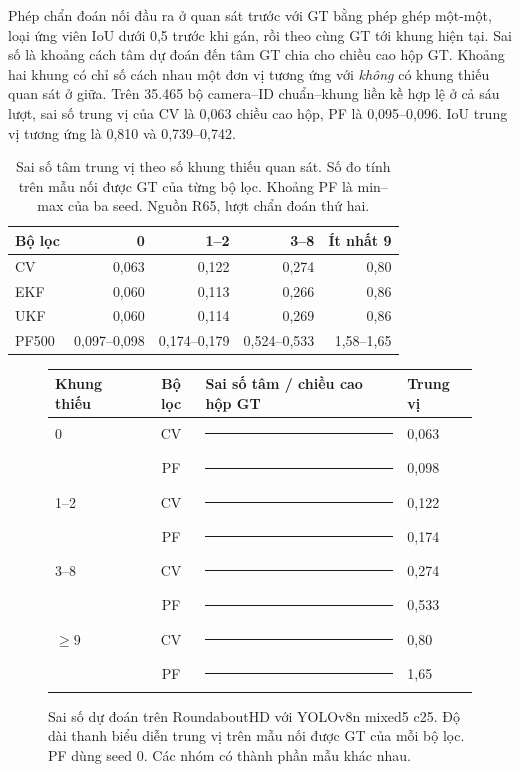 Phép chẩn đoán nối đầu ra ở quan sát trước với GT bằng phép ghép một-một, loại ứng viên IoU dưới 0,5 trước khi gán, rồi theo cùng GT tới khung hiện tại. Sai số là khoảng cách tâm dự đoán đến tâm GT chia cho chiều cao hộp GT. Khoảng hai khung có chỉ số cách nhau một đơn vị tương ứng với \emph{không} có khung thiếu quan sát ở giữa. Trên 35.465 bộ camera--ID chuẩn--khung liền kề hợp lệ ở cả sáu lượt, sai số trung vị của CV là 0,063 chiều cao hộp, PF là 0,095--0,096. IoU trung vị tương ứng là 0,810 và 0,739--0,742.

\begin{table}[htbp]\centering\small
\caption{Sai số tâm trung vị theo số khung thiếu quan sát. Số đo tính trên mẫu nối được GT của từng bộ lọc. Khoảng PF là min--max của ba seed. Nguồn R65, lượt chẩn đoán thứ hai.}\label{tab:gap}
\begin{tabular}{lrrrr}\hline
Bộ lọc & 0 & 1--2 & 3--8 & Ít nhất 9\\\hline
CV & 0,063 & 0,122 & 0,274 & 0,80\\
EKF & 0,060 & 0,113 & 0,266 & 0,86\\
UKF & 0,060 & 0,114 & 0,269 & 0,86\\
PF500 & 0,097--0,098 & 0,174--0,179 & 0,524--0,533 & 1,58--1,65\\\hline
\end{tabular}
\end{table}

\begin{figure}[htbp]\centering\small
\begin{tabular}{lcll}\hline
Khung thiếu & Bộ lọc & Sai số tâm / chiều cao hộp GT & Trung vị\\\hline
0 & CV & \rule{2.52mm}{1.6mm} & 0,063\\
  & PF & \rule{3.92mm}{1.6mm} & 0,098\\[2pt]
1--2 & CV & \rule{4.88mm}{1.6mm} & 0,122\\
  & PF & \rule{6.96mm}{1.6mm} & 0,174\\[2pt]
3--8 & CV & \rule{10.96mm}{1.6mm} & 0,274\\
  & PF & \rule{21.32mm}{1.6mm} & 0,533\\[2pt]
$\geq9$ & CV & \rule{32mm}{1.6mm} & 0,80\\
  & PF & \rule{66mm}{1.6mm} & 1,65\\\hline
\end{tabular}
\caption{Sai số dự đoán trên RoundaboutHD với YOLOv8n mixed5 c25. Độ dài thanh biểu diễn trung vị trên mẫu nối được GT của mỗi bộ lọc. PF dùng seed 0. Các nhóm có thành phần mẫu khác nhau.}
\end{figure}

